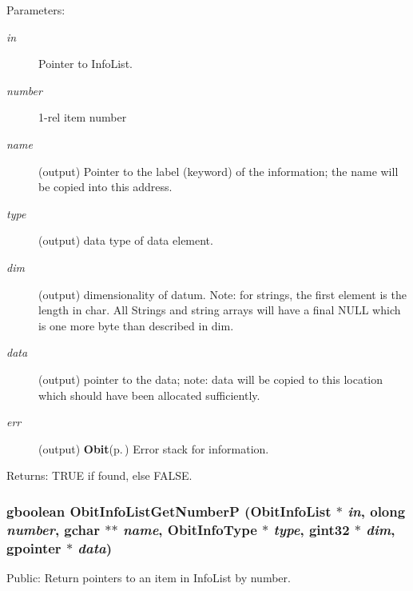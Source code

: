 \begin{Desc}
\item[Parameters:]
\begin{description}
\item[{\em in}]Pointer to Info\-List. \item[{\em number}]1-rel item number \item[{\em name}](output) Pointer to the label (keyword) of the information; the name will be copied into this address. \item[{\em type}](output) data type of data element. \item[{\em dim}](output) dimensionality of datum. Note: for strings, the first element is the length in char. All Strings and string arrays will have a final NULL which is one more byte than described in dim. \item[{\em data}](output) pointer to the data; note: data will be copied to this location which should have been allocated sufficiently. \item[{\em err}](output) {\bf Obit}{\rm (p.\,\pageref{structObit})} Error stack for information. \end{description}
\end{Desc}
\begin{Desc}
\item[Returns:]TRUE if found, else FALSE. \end{Desc}
\subsubsection{\setlength{\rightskip}{0pt plus 5cm}gboolean Obit\-Info\-List\-Get\-Number\-P ({\bf Obit\-Info\-List} $\ast$ {\em in}, {\bf olong} {\em number}, gchar $\ast$$\ast$ {\em name}, Obit\-Info\-Type $\ast$ {\em type}, gint32 $\ast$ {\em dim}, gpointer $\ast$ {\em data})}\label{ObitInfoList_8c_a19}


Public: Return pointers to an item in Info\-List by number. 

